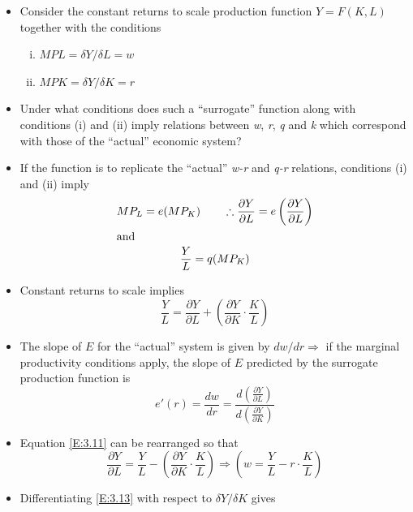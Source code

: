 \documentclass{article}
\begin{document}
	\begin{itemize}
		\item Consider the constant returns to scale production function \( Y = F(K, L) \) together with the conditions
		\begin{enumerate}[(i)]
			\item \( MPL = \delta Y/ \delta L = w \)
			\item \( MPK = \delta Y/ \delta K = r \)
		\end{enumerate}
		\item \textcolor{myred}{Under what conditions does such a ``surrogate'' function along with conditions (i) and (ii) imply relations between  \textit{w}, \textit{r}, \textit{q} and \textit{k} which correspond with those of the ``actual'' economic system?}
		\item If the function is to replicate the ``actual'' \textit{w-r} and \textit{q-r} relations, conditions (i) and (ii) imply
		\begin{gather}
			MP_L = e(MP_K) \qquad \therefore \frac{\partial Y}{\partial L} = e\left(\frac{\partial Y}{\partial L}\right) \label{E:3.9} \\
			\intertext{and}
			\frac{Y}{L} = q(MP_K) \label{E:3.10}
		\end{gather}
		\item Constant returns to scale implies
		\begin{equation}
			\frac{Y}{L} = \frac{\partial Y}{\partial L} + \left(\frac{\partial Y}{\partial K} \cdot \frac{K}{L}\right) \label{E:3.11}
		\end{equation}
		\item The slope of \( E \) for the ``actual'' system is given by \( dw/dr \Rightarrow \) if the marginal productivity conditions apply, the slope of \( E \) predicted by the surrogate production function is
		\begin{equation}
			e'(r) = \frac{dw}{dr} = \frac{d\left(\frac{\partial Y}{\partial L}\right)}{d\left(\frac{\partial Y}{\partial K}\right)} \label{E:3.12}
		\end{equation}
		\item Equation \ref{E:3.11} can be rearranged so that
		\begin{equation}
			\frac{\partial Y}{\partial L} = \frac{Y}{L} - \left(\frac{\partial Y}{\partial K} \cdot \frac{K}{L}\right) \Rightarrow \left(w = \frac{Y}{L} - r\cdot\frac{K}{L}\right) \label{E:3.13}
		\end{equation}
		\item Differentiating \cref{E:3.13} with respect to \( \delta Y/\delta K \) gives

\end{itemize}
\end{document}
